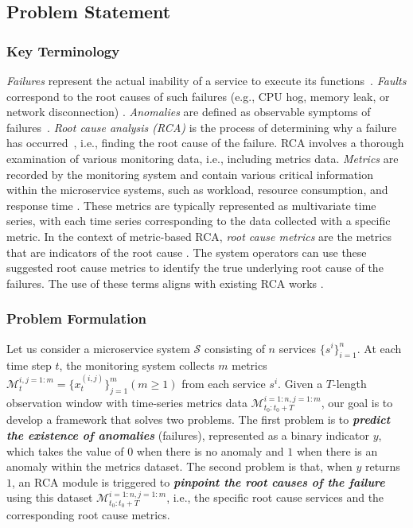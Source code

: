 \subsection{Problem Statement}

\subsubsection{Key Terminology} \label{sec:key-terms}

\textit{Failures} represent the actual inability of a service to execute its functions~\cite{Soldani2022rcasurvey}. \textit{Faults} correspond to the root causes of such failures (e.g., CPU hog, memory leak, or network disconnection) \cite{Soldani2022rcasurvey, avizienis2004basic}. \textit{Anomalies} are defined as observable symptoms of failures~\cite{Li2022Circa, Soldani2022rcasurvey}. \textit{Root cause analysis (RCA)} is the process of determining why a failure has occurred~\cite{lee2023eadro}, i.e., finding the root cause of the failure. RCA involves a thorough examination of various monitoring data, i.e., including metrics data. \textit{Metrics} are recorded by the monitoring system and contain various critical information within the microservice systems, such as workload, resource consumption, and response time \cite{Xin2023CausalRCA}. These metrics are typically represented as multivariate time series, with each time series corresponding to the data collected with a specific metric. In the context of metric-based RCA, \textit{root cause metrics} are the metrics that are indicators of the root cause \cite{Li2022Circa, chen2022adaptive, Azam2022rcd}. The system operators can use these suggested root cause metrics to identify the true underlying root cause of the failures. The use of these terms aligns with existing RCA works \cite{Chen2014Causeinfer, chen2016causeinfer, chen2022adaptive, Azam2022rcd, Li2022Circa, liu2023pyrca, Meng2020Microcause, Xin2023CausalRCA}.


\subsubsection{Problem Formulation} \label{sec:problem-formulation}
Let us consider a microservice system $\mathcal{S}$ consisting of $n$ services $\{ s^i \}_{i=1}^n$. At each time step $t$, the monitoring system collects $m$ metrics $\mathcal{M}^{i,j=1:m}_t = \{x^{(i, j)}_t\}_{j=1}^{m} (m \geq 1)$ from each service $s^i$. Given a $T$-length observation window with time-series metrics data $\mathcal{M}^{i=1:n,j=1:m}_{t_0:t_0+T}$, our goal is to develop a framework that solves two problems. The first problem is to \textbf{\textit{predict the existence of anomalies}} (failures), represented as a binary indicator $y$, which takes the value of $0$ when there is no anomaly and $1$ when there is an anomaly within the metrics dataset. The second problem is that, when $y$ returns $1$, an RCA module is triggered to \textit{\textbf{pinpoint the root causes of the failure}} using this dataset $\mathcal{M}^{i=1:n,j=1:m}_{t_0:t_0+T}$, i.e., the specific root cause services and the corresponding root cause metrics.

